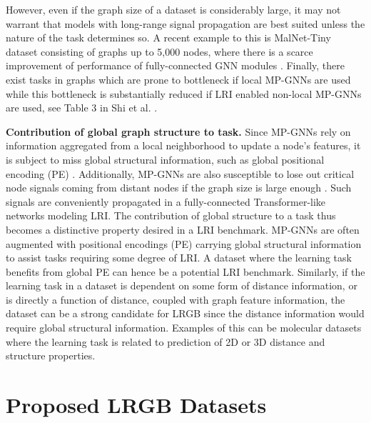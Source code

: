 \documentclass{article}
\begin{document}
However, even if the graph size of a dataset is considerably large, it may not warrant that models with long-range signal propagation are best suited unless the nature of the task determines so. A recent example to this is MalNet-Tiny dataset \cite{freitas2020large} consisting of graphs up to 5,000 nodes, where there is a scarce improvement of performance of fully-connected GNN modules \cite{rampasek2022GPS}.
Finally, there exist tasks in graphs which are prone to bottleneck if local MP-GNNs are used while this bottleneck is substantially reduced if LRI enabled non-local MP-GNNs are used, see Table 3 in Shi et al. \cite{shi2022benchmarking}.




\textbf{Contribution of global graph structure to task.}
Since MP-GNNs rely on information aggregated from a local neighborhood to update a node’s features, it is subject to miss global structural information, such as global positional encoding (PE) \cite{rampasek2022GPS}. Additionally, MP-GNNs are also susceptible to lose out critical node signals coming from distant nodes if the graph size is large enough \cite{alon2020bottleneck}. Such signals are conveniently propagated in a fully-connected Transformer-like networks modeling LRI. The contribution of global structure to a task thus becomes a distinctive property desired in a LRI benchmark. MP-GNNs are often augmented with positional encodings (PE) carrying global structural information to assist tasks requiring some degree of LRI. A dataset where the learning task benefits from global PE can hence be a potential LRI benchmark. Similarly, if the learning task in a dataset is dependent on some form of distance information, or is directly a function of distance, coupled with graph feature information, the dataset can be a strong candidate for LRGB since the distance information would require global structural information. Examples of this can be molecular datasets where the learning task is related to prediction of 2D or 3D distance and structure properties.


\section{Proposed LRGB Datasets}
\label{sec:proposed_datasets}
\end{document}
